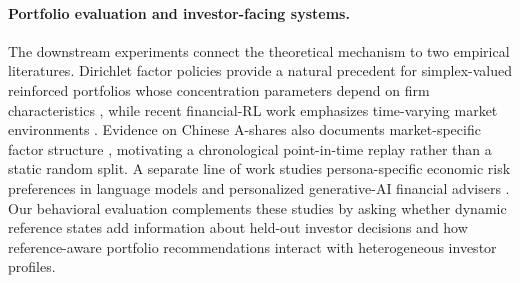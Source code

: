 \paragraph{Portfolio evaluation and investor-facing systems.}
The downstream experiments connect the theoretical mechanism to two empirical literatures.  Dirichlet factor policies provide a natural precedent for simplex-valued reinforced portfolios whose concentration parameters depend on firm characteristics \citep{andre2020dirichlet}, while recent financial-RL work emphasizes time-varying market environments \citep{liu2024dynamicdatasets}.  Evidence on Chinese A-shares also documents market-specific factor structure \citep{hanauer2024factor}, motivating a chronological point-in-time replay rather than a static random split.  A separate line of work studies persona-specific economic risk preferences in language models \citep{liu2025riskpreferences} and personalized generative-AI financial advisers \citep{takayanagi2025financialadvisors}.  Our behavioral evaluation complements these studies by asking whether dynamic reference states add information about held-out investor decisions and how reference-aware portfolio recommendations interact with heterogeneous investor profiles.
